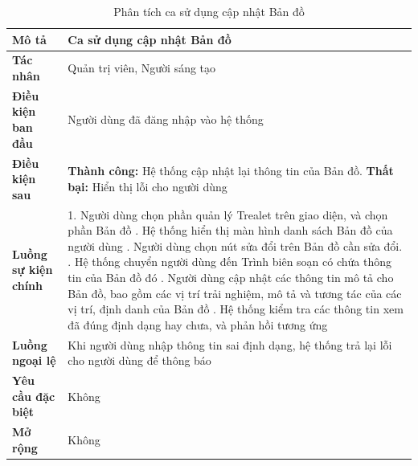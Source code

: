 \begin{table}
\centering
\caption{Phân tích ca sử dụng cập nhật Bản đồ}
\begin{tabular}{|p{4cm}|p{10cm}|}
    \hline
\textbf{Mô tả} & Ca sử dụng cập nhật Bản đồ \\ \hline
\textbf{Tác nhân} & Quản trị viên, Người sáng tạo \\ \hline
\textbf{Điều kiện ban đầu} & Người dùng đã đăng nhập vào hệ thống \\ \hline
\textbf{Điều kiện sau} & 
\textbf{Thành công:} Hệ thống cập nhật lại thông tin của Bản đồ. \newline
\textbf{Thất bại:} Hiển thị lỗi cho người dùng \\ \hline
\textbf{Luồng sự kiện chính} & 
1. Người dùng chọn phần quản lý
Trealet trên giao diện, và chọn
phần Bản đồ \newline
2. Hệ thống hiển thị màn hình danh
sách Bản đồ của người dùng \newline
3. Người dùng chọn nút sửa đổi trên
Bản đồ cần sửa đổi. \newline
4. Hệ thống chuyển người dùng đến
Trình biên soạn có chứa thông tin
của Bản đồ đó \newline
5. Người dùng cập nhật các thông
tin mô tả cho Bản đồ, bao gồm các vị
trí trải nghiệm, mô tả và tương tác
của các vị trí, định danh của Bản
đồ \newline
6. Hệ thống kiểm tra các thông tin
xem đã đúng định dạng hay chưa,
và phản hồi tương ứng \\ \hline
\textbf{Luồng ngoại lệ} & Khi người dùng nhập thông tin sai định dạng, hệ thống trả lại lỗi cho người dùng để thông báo \\ \hline
\textbf{Yêu cầu đặc biệt} & Không \\ \hline
\textbf{Mở rộng} & Không \\ \hline
\end{tabular}
\end{table}
